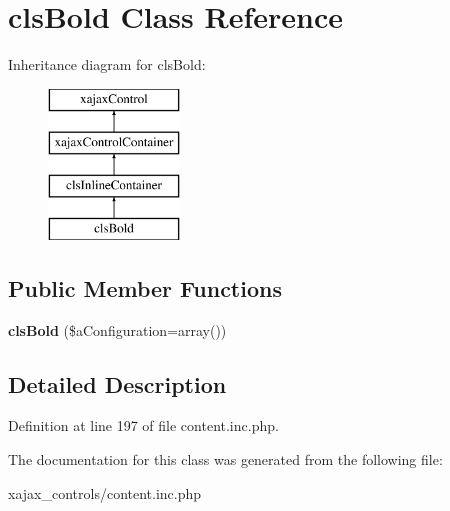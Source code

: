 \hypertarget{classclsBold}{
\section{clsBold Class Reference}
\label{classclsBold}
}
Inheritance diagram for clsBold:\begin{figure}[H]
\begin{center}
\leavevmode
\includegraphics[height=4.000000cm]{classclsBold}
\end{center}
\end{figure}
\subsection*{Public Member Functions}
\begin{DoxyCompactItemize}
\item 
\hypertarget{classclsBold_a2358aad878e20edd0db792ae8d1bfb99}{
{\bfseries clsBold} (\$aConfiguration=array())}
\label{classclsBold_a2358aad878e20edd0db792ae8d1bfb99}

\end{DoxyCompactItemize}


\subsection{Detailed Description}


Definition at line 197 of file content.inc.php.



The documentation for this class was generated from the following file:\begin{DoxyCompactItemize}
\item 
xajax\_\-controls/content.inc.php\end{DoxyCompactItemize}
